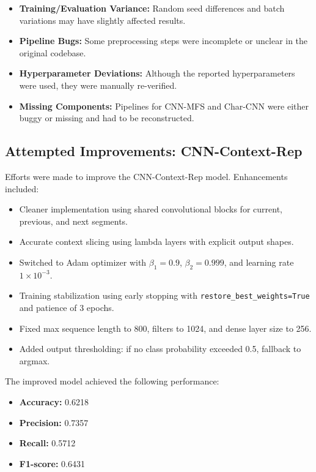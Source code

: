 \documentclass{article}
\begin{document}
\begin{itemize}
    \item \textbf{Training/Evaluation Variance:} Random seed differences and batch variations may have slightly affected results.
    \item \textbf{Pipeline Bugs:} Some preprocessing steps were incomplete or unclear in the original codebase.
    \item \textbf{Hyperparameter Deviations:} Although the reported hyperparameters were used, they were manually re-verified.
    \item \textbf{Missing Components:} Pipelines for CNN-MFS and Char-CNN were either buggy or missing and had to be reconstructed.
\end{itemize}

\subsection{Attempted Improvements: CNN-Context-Rep}

Efforts were made to improve the CNN-Context-Rep model. Enhancements included:

\begin{itemize}
    \item Cleaner implementation using shared convolutional blocks for current, previous, and next segments.
    \item Accurate context slicing using lambda layers with explicit output shapes.
    \item Switched to Adam optimizer with $\beta_1 = 0.9$, $\beta_2 = 0.999$, and learning rate $1 \times 10^{-3}$.
    \item Training stabilization using early stopping with \texttt{restore\_best\_weights=True} and patience of 3 epochs.
    \item Fixed max sequence length to 800, filters to 1024, and dense layer size to 256.
    \item Added output thresholding: if no class probability exceeded 0.5, fallback to argmax.
\end{itemize}

The improved model achieved the following performance:

\begin{itemize}
    \item \textbf{Accuracy:} 0.6218
    \item \textbf{Precision:} 0.7357
    \item \textbf{Recall:} 0.5712
    \item \textbf{F1-score:} 0.6431
\end{itemize}
\end{document}
